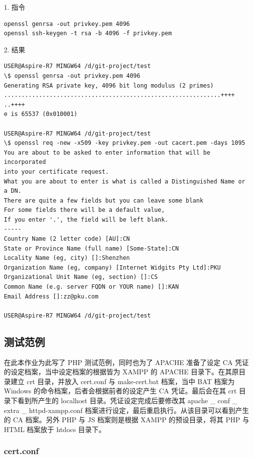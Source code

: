 1. 指令

\begin{Verbatim}
openssl genrsa -out privkey.pem 4096
openssl ssh-keygen -t rsa -b 4096 -f privkey.pem
\end{Verbatim}

2. 结果

\begin{Verbatim}
USER@Aspire-R7 MINGW64 /d/git-project/test
\$ openssl genrsa -out privkey.pem 4096
Generating RSA private key, 4096 bit long modulus (2 primes)
..............................................................++++
..++++
e is 65537 (0x010001)

USER@Aspire-R7 MINGW64 /d/git-project/test
\$ openssl req -new -x509 -key privkey.pem -out cacert.pem -days 1095
You are about to be asked to enter information that will be incorporated
into your certificate request.
What you are about to enter is what is called a Distinguished Name or a DN.
There are quite a few fields but you can leave some blank
For some fields there will be a default value,
If you enter '.', the field will be left blank.
-----
Country Name (2 letter code) [AU]:CN
State or Province Name (full name) [Some-State]:CN
Locality Name (eg, city) []:Shenzhen
Organization Name (eg, company) [Internet Widgits Pty Ltd]:PKU
Organizational Unit Name (eg, section) []:CS
Common Name (e.g. server FQDN or YOUR name) []:KAN
Email Address []:zz@pku.com

USER@Aspire-R7 MINGW64 /d/git-project/test
\end{Verbatim}

\subsection{测试范例}

在此本作业为此写了 PHP 测试范例，同时也为了 APACHE 准备了设定 CA 凭证的设定档案，当中设定档案的根据皆为 XAMPP 的 APACHE 目录下。在其原目录建立 crt 目录，并放入 cert.conf 与 make-cert.bat 档案，当中 BAT 档案为 Windows 的命令档案，后者会根据前者的设定产生 CA 凭证。最后会在其 crt 目录下看到所产生的 localhost 目录。凭证设定完成后要修改其 apache \_ conf \_ extra \_ httpd-xampp.conf 档案进行设定，最后重启执行。从该目录可以看到产生的 CA 档案。另外 PHP 与 JS 档案则是根据 XAMPP 的预设目录，将其 PHP 与 HTML 档案放于 htdocs 目录下。

\subsubsection{cert.conf}

